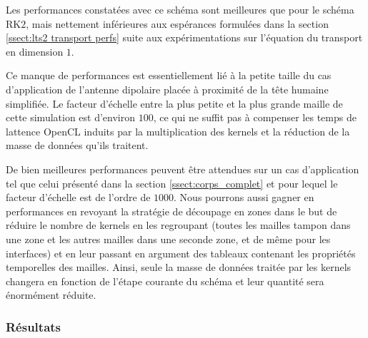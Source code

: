 Les performances constatées avec ce schéma sont meilleures que pour le
schéma RK$2$, mais nettement inférieures aux espérances formulées dans 
la section \ref{ssect:lts2 transport perfs} suite aux expérimentations
sur l'équation du transport en dimension $1$.

Ce manque de performances est essentiellement lié à la petite taille du
cas d'application de l'antenne dipolaire placée à proximité de la
tête humaine simplifiée. Le facteur d'échelle entre la plus petite
et la plus grande maille de cette simulation
est d'environ $100$, ce qui ne suffit pas à compenser les temps
de lattence OpenCL induits par la multiplication des kernels et
la réduction de la masse de données qu'ils traitent.

De bien meilleures performances peuvent être attendues sur un cas
d'application tel que celui présenté dans la section \ref{ssect:corps_complet}
et pour lequel le facteur d'échelle est de l'ordre de $1000$.
Nous pourrons aussi gagner en performances en revoyant la stratégie de
découpage en zones dans le but de réduire le nombre de kernels en les regroupant
(toutes les mailles tampon dans une zone et les autres mailles dans une seconde zone,
et de même pour les interfaces)
et en leur passant en argument des tableaux contenant les propriétés temporelles des mailles.
Ainsi, seule la masse de données traitée par les kernels changera en fonction
de l'étape courante du schéma et leur quantité sera énormément réduite.




\subsubsection{Résultats}


